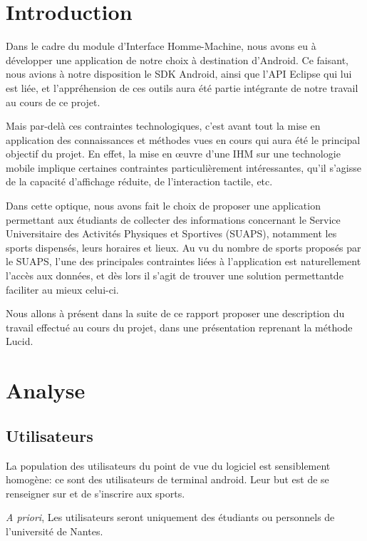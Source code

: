 \documentclass[french, titlepage, 11pt, a4paper]{article}
\begin{document}
\tableofcontents\clearpage

\section*{Introduction}

Dans le cadre du module d'Interface Homme-Machine, nous avons eu à développer
une application de notre choix à destination d'Android.
Ce faisant, nous avions à notre disposition le SDK Android, ainsi que l'API
Eclipse qui lui est liée, et l'appréhension de ces outils aura été partie
intégrante de notre travail au cours de ce projet.

Mais par-delà ces contraintes technologiques, c'est avant tout la mise en
application des connaissances et méthodes vues en cours qui aura été le
principal objectif du projet.
En effet, la mise en œuvre d'une IHM sur une technologie mobile implique
certaines contraintes particulièrement intéressantes, qu'il s'agisse de la
capacité d'affichage réduite, de l'interaction tactile, etc.

Dans cette optique, nous avons fait le choix de proposer une application
permettant aux étudiants de collecter des informations concernant le Service
Universitaire des Activités Physiques et Sportives (SUAPS), notamment les sports
dispensés, leurs horaires et lieux.
Au vu du nombre de sports proposés par le SUAPS, l'une des principales
contraintes liées à l'application est naturellement l'accès aux données, et dès
lors il s'agit de trouver une solution permettantde faciliter au mieux celui-ci.

Nous allons à présent dans la suite de ce rapport proposer une description du
travail effectué au cours du projet, dans une présentation reprenant la méthode
Lucid.

\section{Analyse}
\label{sec:analyse}

	\subsection{Utilisateurs}
		La population des utilisateurs du point de vue du logiciel est
		sensiblement homogène: ce sont des utilisateurs de terminal android.
		Leur but est de se renseigner sur et de s'inscrire aux sports.

		\emph{A priori}, Les utilisateurs seront uniquement des étudiants ou
		personnels de l'université de Nantes.
\end{document}
